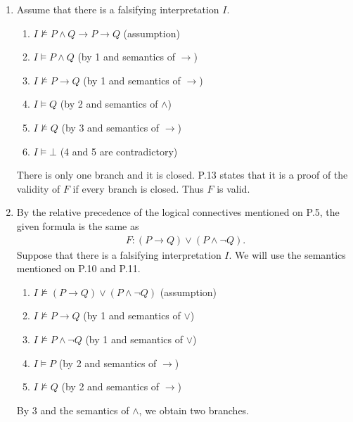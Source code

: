 \begin{exer}[1.1]
    $ $
    \begin{enumerate}[label=(\alph*)]
        \item
            Assume that there is a falsifying interpretation $I$.
            \begin{enumerate}[label=\arabic*.]
                \item %
                    $I \not\models P \land Q \rightarrow P \rightarrow Q$ (assumption)
                \item %
                    $I \models P \land Q$ (by 1 and semantics of $\rightarrow$)
                \item %
                    $I \not\models P \rightarrow Q$ (by 1 and semantics of $\rightarrow$)
                \item %
                    $I \models Q$ (by 2 and semantics of $\land$)
                \item %
                    $I \not\models Q$ (by 3 and semantics of $\rightarrow$)
                \item %
                    $I \models \bot$ (4 and 5 are contradictory)
            \end{enumerate}
            There is only one branch and it is closed.
            P.13 states that it is a proof of the validity of $F$ if every branch is closed.
            Thus $F$ is valid.
        \item
            By the relative precedence of the logical connectives mentioned on P.5, the given formula is the same as
            \begin{align*}
                F: (P \rightarrow Q) \lor (P \land \neg Q).
            \end{align*}
            Suppose that there is a falsifying interpretation $I$.
            We will use the semantics mentioned on P.10 and P.11.
            \begin{enumerate}[label=\arabic*.]
                \item %
                    $I \not\models (P \rightarrow Q) \lor (P \land \neg Q)$ (assumption)
                \item %
                    $I \not\models P \rightarrow Q$ (by 1 and semantics of $\lor$)
                \item %
                    $I \not\models P \land \neg Q$ (by 1 and semantics of $\lor$)
                \item %
                    $I \models P$ (by 2 and semantics of $\rightarrow$)
                \item %
                    $I \not\models Q$ (by 2 and semantics of $\rightarrow$)
            \end{enumerate}
            By 3 and the semantics of $\land$, we obtain two branches.


\end{enumerate}
\end{exer}
